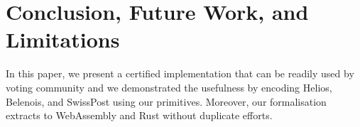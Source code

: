 \documentclass[conference,compsoc]{IEEEtran}
\begin{document}
\section{Conclusion, Future Work, and Limitations}
  In this paper, we present a certified implementation 
  that can be readily used by voting community and 
  we demonstrated the usefulness by encoding Helios, 
  Belenois, and SwissPost using our primitives. 
  Moreover, our formalisation extracts to WebAssembly and 
  Rust without duplicate efforts. 









\end{document}
